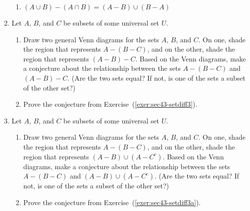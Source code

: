 \begin{enumerate}
\begin{enumerate}
\item $\left( A \cup B \right) - \left( A \cap B \right) = \left( A - B \right) \cup 
\left(B - A \right)$
\end{enumerate}

\item Let  $A$, $B$,  and  $C$  be subsets of some universal set  $U$\!. 
\label{exer:sec43-setdiff3x}%
\begin{enumerate}
  \item Draw two general Venn diagrams for the sets  $A$, $B$, and  $C$.  On one, shade the region that represents  $A - \left( {B - C} \right)$, and on the other, shade the region that represents  $\left( {A - B} \right) - C$.  Based on the Venn diagrams, make a conjecture about the relationship between the sets  $A - \left( {B - C} \right)$  and  $\left( {A - B} \right)  - C$.  (Are the two sets equal?  If not, is one of the sets a subset of the other set?)
\label{exer:sec43-setdiff3}%

  \item Prove the conjecture from Exercise~(\ref{exer:sec43-setdiff3}).
\end{enumerate}


\item Let  $A$, $B$,  and  $C$  be subsets of some universal set  $U$\!. 
\label{exer:sec43-setdiff3x}%
\begin{enumerate}
  \item Draw two general Venn diagrams for the sets  $A$, $B$, and  $C$.  On one, shade the region that represents  $A - \left( {B - C} \right)$, and on the other, shade the region that represents  
$\left( {A - B} \right) \cup \left( A - C^c \right)$.  Based on the Venn diagrams, make a conjecture about the relationship between the sets  $A - \left( {B - C} \right)$  and  
$\left( {A - B} \right) \cup \left( A - C^c \right)$.  (Are the two sets equal?  If not, is one of the sets a subset of the other set?)
\label{exer:sec43-setdiff3a}%

  \item Prove the conjecture from Exercise~(\ref{exer:sec43-setdiff3a}).
\end{enumerate}




\end{enumerate}
